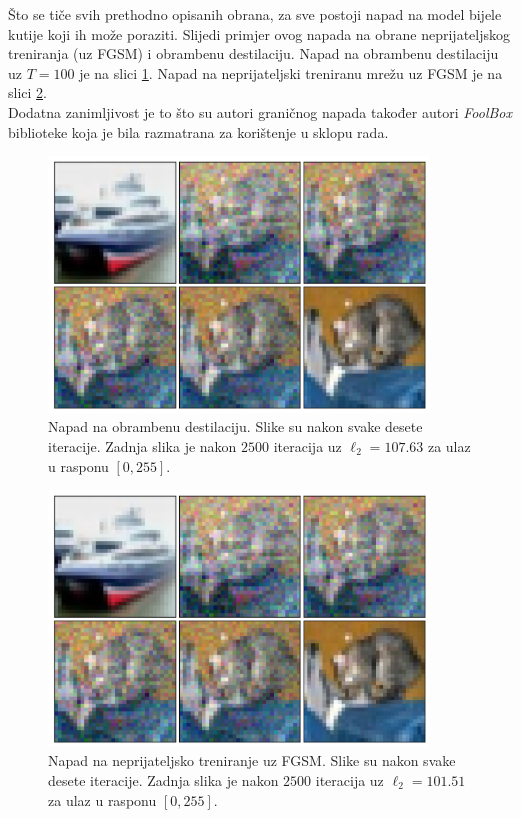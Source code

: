 \documentclass[utf8, diplomski]{fer}
\begin{document}
Što se tiče svih prethodno opisanih obrana, za sve postoji napad na model bijele kutije koji ih može poraziti. Slijedi primjer ovog napada na obrane neprijateljskog treniranja (uz FGSM) i obrambenu destilaciju. Napad na obrambenu destilaciju uz $T = 100$ je na slici \ref{fig:boundary_distillation}. Napad na neprijateljski treniranu mrežu uz FGSM je na slici \ref{fig:boundary_fgsm_adv}. \\
Dodatna zanimljivost je to što su autori graničnog napada također autori \textit{FoolBox} biblioteke koja je bila razmatrana za korištenje u sklopu rada.

\begin{figure}[H]
\centering
\includegraphics[width=0.9\textwidth,keepaspectratio]{img/results/boundary_distillation.png}
\caption{Napad na obrambenu destilaciju. Slike su nakon svake desete iteracije. Zadnja slika je nakon $2500$ iteracija uz $\ell_{2} = 107.63$ za ulaz u rasponu $[0, 255]$.}
\label{fig:boundary_distillation}
\end{figure}

\begin{figure}[H]
\centering
\includegraphics[width=0.9\textwidth,keepaspectratio]{img/results/boundary_distillation.png}
\caption{Napad na neprijateljsko treniranje uz FGSM. Slike su nakon svake desete iteracije. Zadnja slika je nakon $2500$ iteracija uz $\ell_{2} = 101.51$ za ulaz u rasponu $[0, 255]$.}
\label{fig:boundary_fgsm_adv}
\end{figure}
\end{document}
